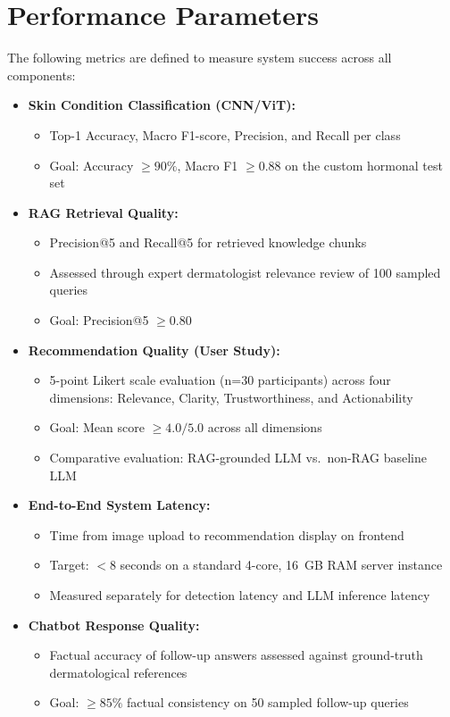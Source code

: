 \section{Performance Parameters}
The following metrics are defined to measure system success across all components:
\begin{itemize}
    \item \textbf{Skin Condition Classification (CNN/ViT):}
    \begin{itemize}
        \item Top-1 Accuracy, Macro F1-score, Precision, and Recall per class
        \item Goal: Accuracy $\geq 90\%$, Macro F1 $\geq 0.88$ on the custom hormonal test set
    \end{itemize}
    \vspace{0.3cm}

    \item \textbf{RAG Retrieval Quality:}
    \begin{itemize}
        \item Precision@5 and Recall@5 for retrieved knowledge chunks
        \item Assessed through expert dermatologist relevance review of 100 sampled queries
        \item Goal: Precision@5 $\geq 0.80$
    \end{itemize}
    \vspace{0.3cm}

    \item \textbf{Recommendation Quality (User Study):}
    \begin{itemize}
        \item 5-point Likert scale evaluation (n=30 participants) across four dimensions: Relevance, Clarity, Trustworthiness, and Actionability
        \item Goal: Mean score $\geq 4.0/5.0$ across all dimensions
        \item Comparative evaluation: RAG-grounded LLM vs.\ non-RAG baseline LLM
    \end{itemize}
    \vspace{0.3cm}

    \item \textbf{End-to-End System Latency:}
    \begin{itemize}
        \item Time from image upload to recommendation display on frontend
        \item Target: $< 8$ seconds on a standard 4-core, 16~GB RAM server instance
        \item Measured separately for detection latency and LLM inference latency
    \end{itemize}
    \vspace{0.3cm}

    \item \textbf{Chatbot Response Quality:}
    \begin{itemize}
        \item Factual accuracy of follow-up answers assessed against ground-truth dermatological references
        \item Goal: $\geq 85\%$ factual consistency on 50 sampled follow-up queries
    \end{itemize}
\end{itemize}
